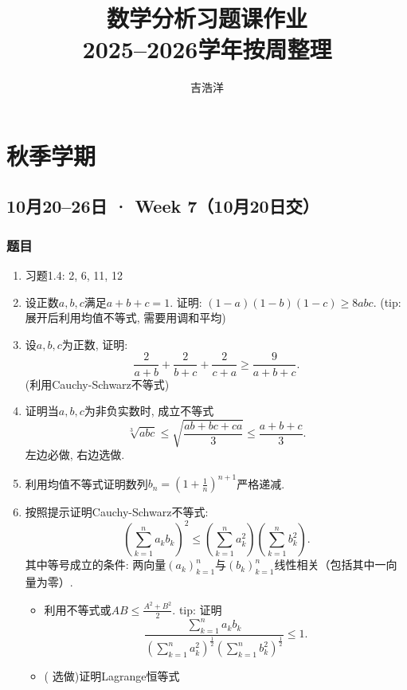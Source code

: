 \documentclass[UTF8,11pt, a4paper, oneside, fontset=none]{ctexbook}
\title{数学分析习题课作业\\2025--2026学年按周整理}
\author{吉浩洋}
\date{}
\begin{document}
\maketitle
\tableofcontents
\clearpage
\chapter{秋季学期}
\clearpage
\section{10月20--26日 · Week 7（10月20日交）}
\subsection*{题目}
\begin{enumerate}

\item 习题1.4: 2, 6, 11, 12

\item 设正数$a, b, c$满足$a + b + c =1$. 证明: $(1-a)(1-b)(1-c) \geq 8abc$. (tip: 展开后利用均值不等式, 需要用调和平均)

\item 设$a, b, c$为正数, 证明:
\[
\frac{2}{a + b} + \frac{2}{b + c} + \frac{2}{c + a} \geq \frac{9}{a + b + c}.
\]
(利用Cauchy-Schwarz不等式)

\item 证明当$a, b, c$为非负实数时, 成立不等式
\[
\sqrt[3]{abc} \leq \sqrt{\frac{ab + bc + ca}{3}} \leq \frac{a+b+c}{3}.
\]
{\color{red} 左边必做, 右边选做}. 

\item 利用均值不等式证明数列$b_n = \left( 1 + \frac{1}{n}\right)^{n+1}$严格递减.

\item 按照提示证明Cauchy-Schwarz不等式:
\[ \left( \sum_{k=1}^{n}a_k b_k\right)^2 \leq \left( \sum_{k=1}^{n}a_k^2\right) \left( \sum_{k=1}^{n}b_k^2\right).
\]
其中等号成立的条件: 两向量$(a_k)_{k=1}^n$与$(b_k)_{k=1}^n$线性相关（包括其中一向量为零）.

\begin{itemize}
\item[(a)] 利用不等式或$AB \leq \frac{A^2+B^2}{2}$. tip: 证明
\[
\frac{ \sum\limits_{k=1}^n a_k b_k }{ \left( \sum\limits_{k=1}^n a_k^2 \right)^{\frac{1}{2}}  \left( \sum\limits_{k=1}^n b_k^2 \right)^{\frac{1}{2}} }  \leq 1.
\]

\item[(b)] ({\color{red} 选做})证明Lagrange恒等式


\end{itemize}
\end{enumerate}
\end{document}
